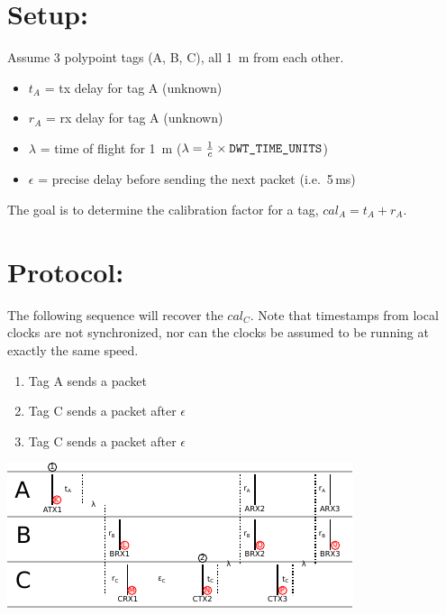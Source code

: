 \documentclass{article}
\begin{document}
\newcommand{\tda}[1]{\textcolor{red}{#1}}
\newcommand{\tdb}[1]{\textcolor{orange}{#1}}
\newcommand{\tdc}[1]{\textcolor{blue}{#1}}
\newcommand{\unk}[1]{\textcolor{red}{#1}}
\newcommand{\der}[1]{\textcolor{orange}{#1}}
\newcommand{\off}[2]{\textnormal{\emph{Off}}_{#1\rightarrow#2}}

\section*{Setup:} Assume 3 polypoint tags (A, B, C), all 1~m from each other.

\begin{itemize}
  \item $t_A$ = tx delay for tag A (unknown)
  \item $r_A$ = rx delay for tag A (unknown)
  \item $\lambda$ = time of flight for 1~m ($\lambda = \frac{1}{c}\times\textnormal{\texttt{DWT\_TIME\_UNITS}}$)
  \item $\epsilon$ = precise delay before sending the next packet (i.e.\ 5\,ms)
\end{itemize}

The goal is to determine the calibration factor for a tag, $cal_A = t_A + r_A$.

\section*{Protocol:}

The following sequence will recover the $cal_C$. Note that timestamps from
local clocks are not synchronized, nor can the clocks be assumed to be running
at exactly the same speed.

\bigskip

\begin{minipage}{.4\textwidth}
  \begin{enumerate}
    \item Tag A sends a packet
    \item Tag C sends a packet after $\epsilon$
    \item Tag C sends a packet after $\epsilon$
  \end{enumerate}
\end{minipage}%
\begin{minipage}{.6\textwidth}
  \includegraphics[width=\linewidth]{calibration_diagram}
\end{minipage}
\end{document}
